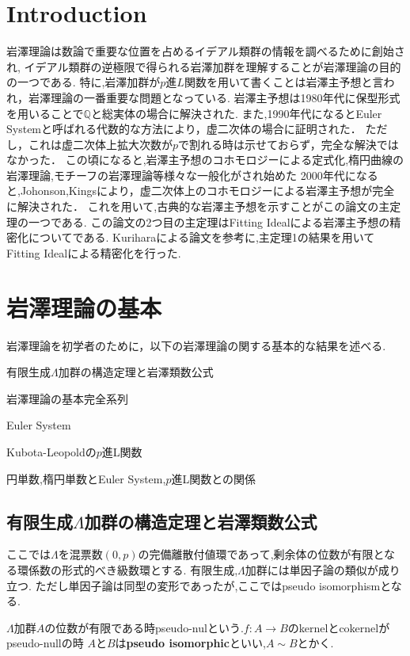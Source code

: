 \documentclass{ujarticle}
\renewenvironment{enumerate}
{
\begin{list}{\arabic{enumi}.}
{
\usecounter{enumi}
\setlength{\topsep}{0zh}
\setlength{\itemindent}{0zw}
\setlength{\leftmargin}{2zw} %
\setlength{\rightmargin}{0zw} %
\setlength{\labelsep}{1zw} %
\setlength{\labelwidth}{3zw} %
\setlength{\itemsep}{0em} %
\setlength{\parsep}{0em} %
\setlength{\listparindent}{1zw} %
}
}{
\end{list}
}
\begin{document}
\section{Introduction}
\label{sec:Introduction}
岩澤理論は数論で重要な位置を占めるイデアル類群の情報を調べるために創始され,
イデアル類群の逆極限で得られる岩澤加群を理解することが岩澤理論の目的の一つである.
特に,岩澤加群が$p$進$L$関数を用いて書くことは岩澤主予想と言われ，岩澤理論の一番重要な問題となっている.
岩澤主予想は1980年代に保型形式を用いることで$\mathbb{Q}$と総実体の場合に解決された.
また,1990年代になるとEuler Systemと呼ばれる代数的な方法により，虚二次体の場合に証明された．
ただし，これは虚二次体上拡大次数が$p$で割れる時は示せておらず，完全な解決ではなかった．
この頃になると,岩澤主予想のコホモロジーによる定式化,楕円曲線の岩澤理論,モチーフの岩澤理論等様々な一般化がされ始めた
2000年代になると,Johonson,Kingsにより，虚二次体上のコホモロジーによる岩澤主予想が完全に解決された．
これを用いて,古典的な岩澤主予想を示すことがこの論文の主定理の一つである.
この論文の2つ目の主定理はFitting Idealによる岩澤主予想の精密化についてである.
Kuriharaによる論文を参考に,主定理1の結果を用いてFitting Idealによる精密化を行った.

\section{岩澤理論の基本}
\label{岩澤理論の基本}
岩澤理論を初学者のために，以下の岩澤理論の関する基本的な結果を述べる.
\begin{enumerate}
  \item 有限生成$\Lambda$加群の構造定理と岩澤類数公式
  \item 岩澤理論の基本完全系列
  \item Euler System
  \item Kubota-Leopoldの$p$進L関数
  \item 円単数,楕円単数とEuler System,$p$進L関数との関係
\end{enumerate}

\subsection{有限生成$\Lambda$加群の構造定理と岩澤類数公式}
\label{sub:有限生成}
ここでは$\Lambda$を混票数$(0,p)$の完備離散付値環であって,剰余体の位数が有限となる環係数の形式的べき級数環とする.
有限生成,$\Lambda$加群には単因子論の類似が成り立つ.
ただし単因子論は同型の変形であったが,ここではpseudo isomorphismとなる.
\begin{dfn}
  $\Lambda$加群$A$の位数が有限である時pseudo-nulという.$f:A \to B$のkernelとcokernelがpseudo-nullの時
  $A$と$B$は\textbf{pseudo isomorphic}といい,$A \sim B$とかく.
\end{dfn}
\end{document}
